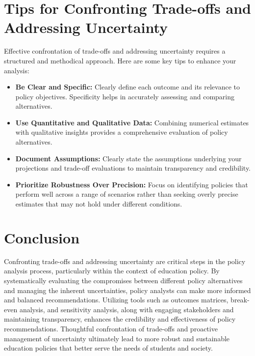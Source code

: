 \documentclass{article}
\theoremstyle{definition}
\theoremstyle{plain}
\begin{document}
\section{Tips for Confronting Trade-offs and Addressing Uncertainty}

Effective confrontation of trade-offs and addressing uncertainty requires a structured and methodical approach. Here are some key tips to enhance your analysis:

\begin{itemize}
    \item \textbf{Be Clear and Specific:} Clearly define each outcome and its relevance to policy objectives. Specificity helps in accurately assessing and comparing alternatives.
    \item \textbf{Use Quantitative and Qualitative Data:} Combining numerical estimates with qualitative insights provides a comprehensive evaluation of policy alternatives.
    \item \textbf{Document Assumptions:} Clearly state the assumptions underlying your projections and trade-off evaluations to maintain transparency and credibility.
    \item \textbf{Prioritize Robustness Over Precision:} Focus on identifying policies that perform well across a range of scenarios rather than seeking overly precise estimates that may not hold under different conditions.
\end{itemize}

\section{Conclusion}

Confronting trade-offs and addressing uncertainty are critical steps in the policy analysis process, particularly within the context of education policy. By systematically evaluating the compromises between different policy alternatives and managing the inherent uncertainties, policy analysts can make more informed and balanced recommendations. Utilizing tools such as outcomes matrices, break-even analysis, and sensitivity analysis, along with engaging stakeholders and maintaining transparency, enhances the credibility and effectiveness of policy recommendations. Thoughtful confrontation of trade-offs and proactive management of uncertainty ultimately lead to more robust and sustainable education policies that better serve the needs of students and society.


\end{document}
